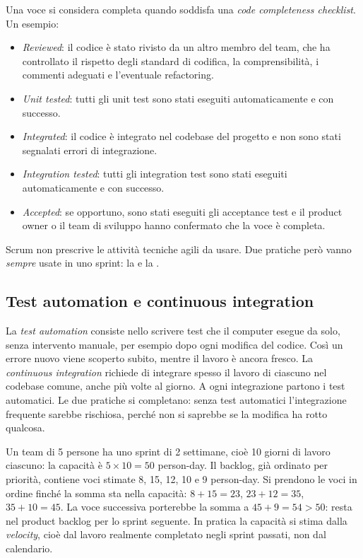 Una voce si considera completa quando soddisfa una \emph{code completeness checklist}. Un esempio:

\begin{itemize}
  \item \emph{Reviewed}: il codice è stato rivisto da un altro membro del team, che ha controllato il rispetto degli
    standard di codifica, la comprensibilità, i commenti adeguati e l'eventuale refactoring.
  \item \emph{Unit tested}: tutti gli unit test sono stati eseguiti automaticamente e con successo.
  \item \emph{Integrated}: il codice è integrato nel codebase del progetto e non sono stati segnalati errori di
    integrazione.
  \item \emph{Integration tested}: tutti gli integration test sono stati eseguiti automaticamente e con successo.
  \item \emph{Accepted}: se opportuno, sono stati eseguiti gli acceptance test e il product owner o il team di
    sviluppo hanno confermato che la voce è completa.
\end{itemize}

Scrum non prescrive le attività tecniche agili da usare. Due pratiche però vanno \emph{sempre} usate in uno sprint:
la  e la .

\subsection{Test automation e continuous integration\aggiunta}

La \emph{test automation} consiste nello scrivere test che il computer esegue da solo, senza intervento manuale,
per esempio dopo ogni modifica del codice. Così un errore nuovo viene scoperto subito, mentre il lavoro è ancora
fresco. La \emph{continuous integration} richiede di integrare spesso il lavoro di ciascuno nel codebase comune, anche
più volte al giorno. A ogni integrazione partono i test automatici. Le due pratiche si completano: senza test
automatici l'integrazione frequente sarebbe rischiosa, perché non si saprebbe se la modifica ha rotto qualcosa.

\begin{esempio}
Un team di 5 persone ha uno sprint di 2 settimane, cioè 10 giorni di lavoro ciascuno: la capacità è
$5 \times 10 = 50$ person-day. Il backlog, già ordinato per priorità, contiene voci stimate 8, 15, 12, 10 e 9
person-day. Si prendono le voci in ordine finché la somma sta nella capacità: $8+15 = 23$, $23+12 = 35$,
$35+10 = 45$. La voce successiva porterebbe la somma a $45+9 = 54 > 50$: resta nel product backlog per lo
sprint seguente. In pratica la capacità si stima dalla \emph{velocity}, cioè dal lavoro realmente completato negli
sprint passati, non dal calendario.
\end{esempio}

